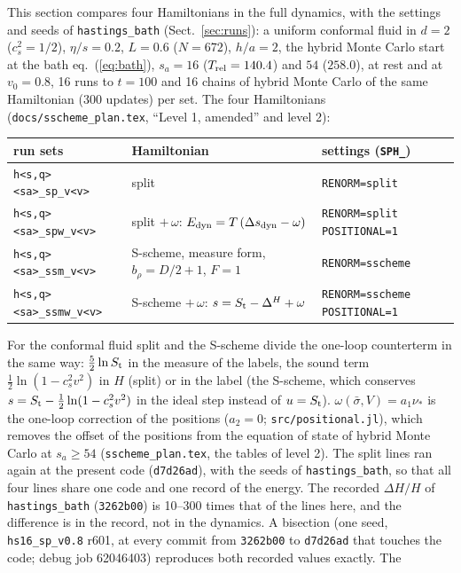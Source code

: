 \documentclass[11pt,aps,preprint,nofootinbib,superscriptaddress,tightenlines]{revtex4-2}
\def\Eq#1{eq.~(\ref{#1})}
\def\Sect#1{Sect.~\ref{#1}}
\begin{document}
This section compares four Hamiltonians in the full dynamics, with the settings and seeds of \texttt{hastings\_bath} (\Sect{sec:runs}): a uniform
conformal fluid in $d=2$ ($c_s^2=1/2$), $\eta/s=0.2$, $L=0.6$ ($N=672$), $h/a=2$, the hybrid Monte Carlo start at the bath \Eq{eq:bath},
$s_a=16$ ($T_{\rm rel}=140.4$) and $54$ ($258.0$), at rest and at $v_0=0.8$, 16 runs to $t=100$ and 16 chains of hybrid Monte Carlo of the same
Hamiltonian (300 updates) per set.  The four Hamiltonians (\texttt{docs/sscheme\_plan.tex}, ``Level 1, amended'' and level 2):
\begin{center}
\footnotesize
\begin{tabular}{lll}
\toprule
run sets & Hamiltonian & settings (\texttt{SPH\_}) \\ \midrule
\texttt{h<s,q><sa>\_sp\_v<v>} & split & \texttt{RENORM=split} \\
\texttt{h<s,q><sa>\_spw\_v<v>} & split $+\,\omega$: $E_{\rm dyn}=T\,(\Delta s_{\rm dyn}-\omega)$ & \texttt{RENORM=split POSITIONAL=1} \\
\texttt{h<s,q><sa>\_ssm\_v<v>} & S-scheme, measure form, $b_\rho=D/2+1$, $F=1$ & \texttt{RENORM=sscheme} \\
\texttt{h<s,q><sa>\_ssmw\_v<v>} & S-scheme $+\,\omega$: $s=S_{\rm t}-\Delta^H+\omega$ & \texttt{RENORM=sscheme POSITIONAL=1} \\
\bottomrule
\end{tabular}
\end{center}
For the conformal fluid split and the S-scheme divide the one-loop counterterm in the same way: $\tfrac52\ln S_{\rm t}$ in the measure of the labels,
the sound term $\tfrac12\ln(1-c_s^2v^2)$ in $H$ (split) or in the label (the S-scheme, which conserves $s=S_{\rm t}-\tfrac12\ln(1-c_s^2v^2)$ in the ideal
step instead of $u=S_{\rm t}$).  $\omega(\bar\sigma,V)=a_1\nu_*$ is the one-loop correction of the positions ($a_2=0$; \texttt{src/positional.jl}),
which removes the offset of the positions from the equation of state of hybrid Monte Carlo at $s_a\ge54$ (\texttt{sscheme\_plan.tex}, the tables of
level 2).  The split lines ran again at the present code (\texttt{d7d26ad}), with the seeds of \texttt{hastings\_bath}, so that all four lines
share one code and one record of the energy.  The recorded $\Delta H/H$ of \texttt{hastings\_bath} (\texttt{3262b00}) is 10--300 times that of the
lines here, and the difference is in the record, not in the dynamics.  A bisection (one seed, \texttt{hs16\_sp\_v0.8} r601, at every commit from
\texttt{3262b00} to \texttt{d7d26ad} that touches the code; debug job 62046403) reproduces both recorded values exactly.  The
\end{document}
